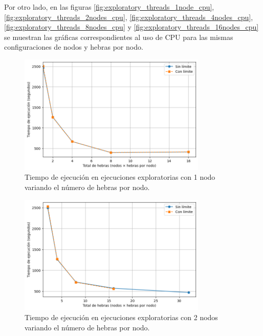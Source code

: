 Por otro lado, en las figuras \ref{fig:exploratory_threads_1node_cpu}, \ref{fig:exploratory_threads_2nodes_cpu}, \ref{fig:exploratory_threads_4nodes_cpu}, \ref{fig:exploratory_threads_8nodes_cpu} y \ref{fig:exploratory_threads_16nodes_cpu} se muestran las gráficas correspondientes al uso de CPU para las mismas configuraciones de nodos y hebras por nodo.

\begin{figure}[ht]
    \centering
    \includegraphics[width=0.8\textwidth]{imagenes/cap5/exploratory_threads_1node.png}
    \caption{Tiempo de ejecución en ejecuciones exploratorias con 1 nodo variando el número de hebras por nodo.}
    \label{fig:exploratory_threads_1node}
\end{figure}

\begin{figure}[ht]
    \centering
    \includegraphics[width=0.8\textwidth]{imagenes/cap5/exploratory_threads_2nodes.png}
    \caption{Tiempo de ejecución en ejecuciones exploratorias con 2 nodos variando el número de hebras por nodo.}
    \label{fig:exploratory_threads_2nodes}
\end{figure}

